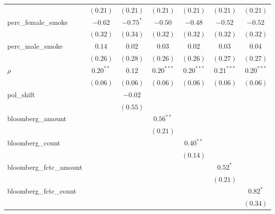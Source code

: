 \begin{table}[!h]
\begin{center}
\begin{tabular}{l c c c c c c }
                        & $(0.21)$     & $(0.21)$    & $(0.21)$     & $(0.21)$     & $(0.21)$     & $(0.21)$     \\
perc\_female\_smoke     & $-0.62$      & $-0.75^{*}$ & $-0.50$      & $-0.48$      & $-0.52$      & $-0.52$      \\
                        & $(0.32)$     & $(0.34)$    & $(0.32)$     & $(0.32)$     & $(0.32)$     & $(0.32)$     \\
perc\_male\_smoke       & $0.14$       & $0.02$      & $0.03$       & $0.02$       & $0.03$       & $0.04$       \\
                        & $(0.26)$     & $(0.28)$    & $(0.26)$     & $(0.26)$     & $(0.27)$     & $(0.27)$     \\
$\rho$                  & $0.20^{**}$  & $0.12$      & $0.20^{***}$ & $0.20^{***}$ & $0.21^{***}$ & $0.20^{***}$ \\
                        & $(0.06)$     & $(0.06)$    & $(0.06)$     & $(0.06)$     & $(0.06)$     & $(0.06)$     \\
pol\_shift              &              & $-0.02$     &              &              &              &              \\
                        &              & $(0.55)$    &              &              &              &              \\
bloomberg\_amount       &              &             & $0.56^{**}$  &              &              &              \\
                        &              &             & $(0.21)$     &              &              &              \\
bloomberg\_count        &              &             &              & $0.40^{**}$  &              &              \\
                        &              &             &              & $(0.14)$     &              &              \\
bloomberg\_fctc\_amount &              &             &              &              & $0.52^{*}$   &              \\
                        &              &             &              &              & $(0.21)$     &              \\
bloomberg\_fctc\_count  &              &             &              &              &              & $0.82^{*}$   \\
                        &              &             &              &              &              & $(0.34)$     \\

\end{tabular}
\end{center}
\end{table}
